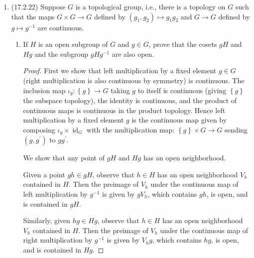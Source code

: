 \documentclass[11pt]{article}
\newcommand{\cbr}[1]{\left\{#1\right\}}
\DeclareMathOperator{\id}{id}
\begin{document}
\begin{enumerate}
    \item (17.2.22) %
    Suppose $G$ is a topological group, i.e., there is a topology on $G$ such that the maps $G\times G\to G$ defined by $(g_1,g_2)\mapsto g_1g_2$ and $G\to G$ defined by $g\mapsto g^{-1}$ are continuous. \begin{enumerate}
        \item If $H$ is an open subgroup of $G$ and $g\in G$, prove that the cosets $gH$ and $Hg$ and the subgroup $gHg^{-1}$ are also open. \begin{proof}
            First we show that left multiplication by a fixed element $g\in G$ (right multiplication is also continuous by symmetry) is continuous. The inclusion map $\iota_g\colon \cbr{g}\to G$ taking $g$ to itself is continuous (giving $\cbr{g}$ the subspace topology), the identity is continuous, and the product of continuous maps is continuous in the product topology. Hence left multiplication by a fixed element $g$ is the continuous map given by composing $\iota_g\times \id_G$ with the multiplication map: $\cbr{g}\times G\to G$ sending $(g,g^\prime)$ to $gg^\prime$.
            
            We show that any point of $gH$ and $Hg$ has an open neighborhood. 

            Given a point $gh\in gH$, observe that $h\in H$ has an open neighborhood $V_h$ contained in $H$. Then the preimage of $V_h$ under the continuous map of left multiplication by $g^{-1}$ is given by $gV_h$, which contains $gh$, is open, and is contained in $gH$. 
            
            Similarly, given $hg \in Hg$, observe that $h\in H$ has an open neighborhood $V_h$ contained in $H$. Then the preimage of $V_h$ under the continuous map of right multiplication by $g^{-1}$ is given by $V_hg$, which contains $hg$, is open, and is contained in $Hg$. 


\end{proof}
\end{enumerate}
\end{enumerate}
\end{document}
